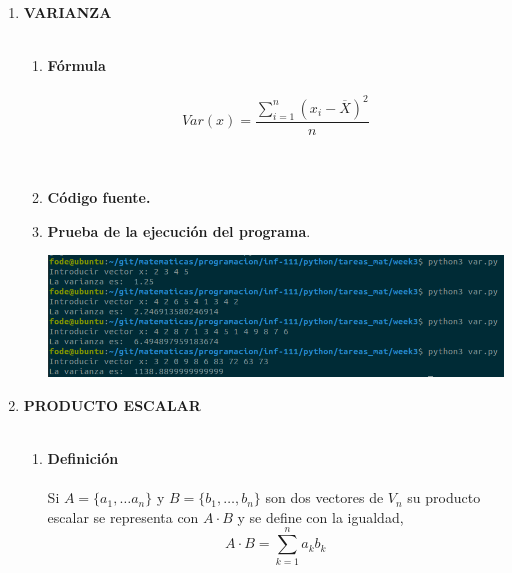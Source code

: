 \begin{enumerate}
\begin{enumerate}[\bfseries a)]
    \end{enumerate}

\newpage


\item \textbf{VARIANZA}\\\\

    \begin{enumerate}[\bfseries a)]

	\item \textbf{Fórmula}\\\\ 
	    $$Var(x) = \dfrac{\sum\limits_{i=1}^{n} (x_i - \overline{X})^2}{n}$$\\\\

	\item \textbf{Código fuente.}\\ 
	    
	    
	    \vspace{3cm}
	
	\item \textbf{Prueba de la ejecución del programa}.\\
	    \begin{center}
		\includegraphics[scale=.5]{imagenes/tareas_mat/week3/var.png}
	    \end{center}

    \end{enumerate}

\newpage

\item \textbf{PRODUCTO ESCALAR}\\\\

    \begin{enumerate}[\bfseries a)]

	\item \textbf{Definición}\\\\ 
	    Si $A=\lbrace a_1,\ldots a_n\rbrace$ y $B=\lbrace b_1,\ldots, b_n\rbrace$ son dos vectores de $V_n$ su producto escalar se representa con $A\cdot B$ y se define con la igualdad,
	    $$A\cdot B = \sum_{k=1}^n a_k b_k$$\\\\


\end{enumerate}
\end{enumerate}
